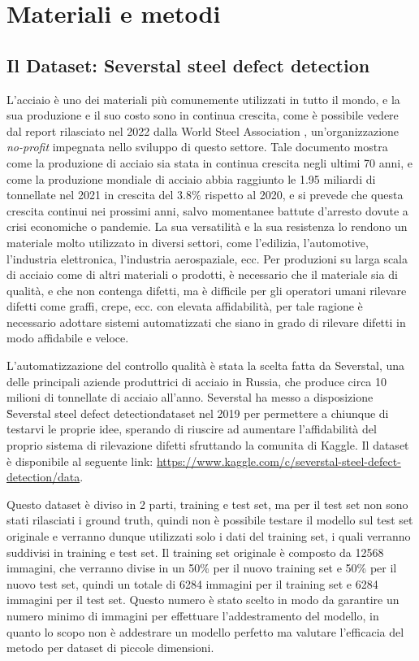 \chapter{Materiali e metodi\ok \ok \ok}

\section{Il Dataset: Severstal steel defect detection \ok}

L'acciaio è uno dei materiali più comunemente utilizzati in tutto il mondo, e la sua produzione e il suo costo sono in continua crescita, come è possibile vedere
dal report rilasciato nel 2022 dalla World Steel Association \cite{worldsteelreport2021}, un'organizzazione \textit{no-profit} impegnata 
nello sviluppo di questo settore.
Tale documento mostra come la produzione di acciaio sia stata in continua crescita negli ultimi 70 anni, e come la produzione mondiale di acciaio
abbia raggiunto le 1.95 miliardi di tonnellate nel 2021 in crescita del 3.8\% rispetto al 2020, e si prevede che questa crescita continui nei prossimi anni, 
salvo momentanee battute d'arresto dovute a crisi economiche o pandemie.
La sua versatilità e la sua resistenza lo rendono un materiale molto utilizzato in diversi settori, come l'edilizia, l'automotive, l'industria elettronica, l'industria aerospaziale, ecc.
Per produzioni su larga scala di acciaio come di altri materiali o prodotti, è necessario che il materiale sia di qualità, e che non contenga difetti,
ma è difficile per gli operatori umani rilevare difetti come graffi, crepe, ecc. con elevata affidabilità, per tale ragione 
è necessario adottare sistemi automatizzati che siano in grado di rilevare difetti in modo affidabile e veloce.

L'automatizzazione del controllo qualità è stata la scelta fatta da Severstal, una delle principali aziende produttrici di acciaio in Russia, che produce circa 10 milioni di tonnellate di acciaio 
all'anno. Severstal ha messo a disposizione \"Severstal steel defect detection\" dataset nel 2019 per permettere a chiunque di testarvi le proprie idee, 
sperando di riuscire ad aumentare l'affidabilità del proprio sistema di rilevazione difetti sfruttando la comunita di Kaggle.
Il dataset è disponibile al seguente link: \url{https://www.kaggle.com/c/severstal-steel-defect-detection/data}.

Questo dataset è diviso in 2 parti, training e test set, ma per il test set non sono stati rilasciati i ground truth, quindi non è possibile testare
il modello sul test set originale e verranno dunque utilizzati solo i dati del training set, i quali verranno suddivisi in training e test set.
Il training set originale  è composto da 12568 immagini, che verranno divise in un 50\% per il nuovo training set e 50\% per il nuovo test set, 
quindi un totale di 6284 immagini per il training set e 6284 immagini per il test set. 
Questo numero è stato scelto in modo da garantire un numero minimo di immagini per effettuare l'addestramento del modello, in quanto 
lo scopo non è addestrare un modello perfetto ma valutare l'efficacia del metodo per dataset di piccole dimensioni. 

